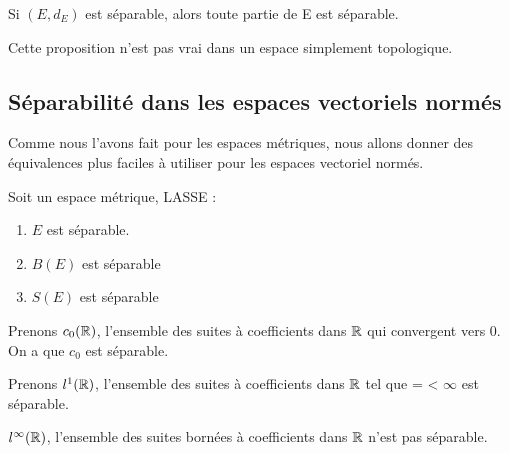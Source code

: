 \begin{proposition}
	Si $(E, d_{E})$ est séparable, alors toute partie de E est séparable.
\end{proposition}

\begin{remarque}
	Cette proposition n'est pas vrai dans un espace simplement topologique.
\end{remarque}

\subsection{Séparabilité dans les espaces vectoriels normés}

Comme nous l'avons fait pour les espaces métriques, nous allons donner des
équivalences plus faciles à utiliser pour les espaces vectoriel normés.

\begin{proposition}
	Soit  un espace métrique, LASSE :
	\begin{enumerate}
		\item $E$ est séparable.
		\item $B(E)$ est séparable
		\item $S(E)$ est séparable
	\end{enumerate}
\end{proposition}

\begin{exemple}
	Prenons $c_{0}(\mathbb{R})$, l'ensemble des suites à coefficients dans $\mathbb{R}$
	qui convergent vers 0. On a que $c_{0}$ est séparable.
\end{exemple}

\begin{exemple}
	Prenons $l^{1}(\mathbb{R})$, l'ensemble des suites à coefficients dans $\mathbb{R}$
	tel que  =  < $\infty$ est
	séparable.
\end{exemple}

\begin{exemple}
	$l^{\infty}(\mathbb{R})$, l'ensemble des suites bornées à coefficients dans
	$\mathbb{R}$ n'est pas séparable.
\end{exemple}


